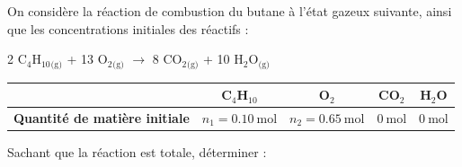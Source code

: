 \finEntrainement







\hauteurLargeurCadreReponse		{6mm}{25mm}
\initialisationEntrainement

On considère la réaction de combustion du butane à l'état gazeux suivante, ainsi que les concentrations initiales des réactifs :   \vspace{-4mm}
\begin{center}
{2 C$_4$H$_{10}$}$_\text{(g)}$ + 13 {O$_2$}$_\text{(g)}$ $\longrightarrow$ 8 {CO$_2$}$_\text{(g)}$ + 10 H$_2$O$_\text{(g)}$

\renewcommand{\arraystretch}{1.2}
\begin{tabular}{|l|c|c|c|c|}
\hline
& C$_4$H$_{10}$ & O$_2$ & CO$_2$ & H$_2$O \\
\hline
\textbf{Quantité de matière initiale}& $n_1=\SI{0,10}{\mol}$ & $n_2=\SI{0,65}{\mol}$ & $\SI{0}{\mol}$ & $\SI{0}{\mol}$\\
\hline
\end{tabular}
\vspace{-1mm}
\end{center}
Sachant que la réaction est totale, déterminer : 



